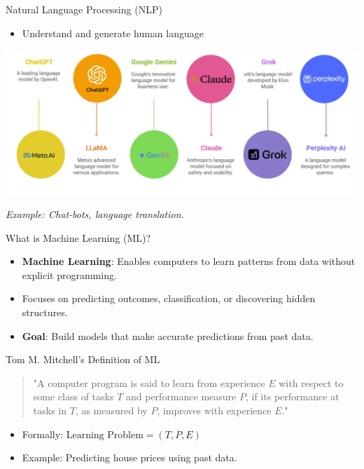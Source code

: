 \documentclass[serif, aspectratio=169]{beamer}
\begin{document}
\begin{frame}{Natural Language Processing (NLP)}
    \begin{itemize}
        \item Understand and generate human language
    \end{itemize}
    \vspace{0.5cm}
    \begin{center}
        \includegraphics[width=0.6\linewidth]{pic/be5.png}
    \end{center}
    \begin{center}
        \textit{Example: Chat-bots, language translation.}
    \end{center}
\end{frame}





\begin{frame}{What is Machine Learning (ML)?}
    \begin{itemize}
        \item \textbf{Machine Learning}: Enables computers to learn patterns from data without explicit programming.
        \item Focuses on predicting outcomes, classification, or discovering hidden structures.
    \vspace{4mm}

        \item \textbf{Goal}: Build models that make accurate predictions from past data.
    \end{itemize}
\end{frame}


\begin{frame}{Tom M. Mitchell's Definition of ML}
    \begin{quote}
    "A computer program is said to learn from experience $E$ with respect to some class of tasks $T$ and performance measure $P$, if its performance at tasks in $T$, as measured by $P$, improves with experience $E$."
    \end{quote}
    \vspace{2mm}
    \begin{itemize}
        \item Formally: $\text{Learning Problem} = (T, P, E)$
        \item Example: Predicting house prices using past data.
    \end{itemize}
\end{frame}
\end{document}
